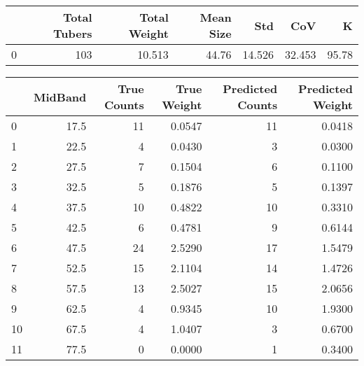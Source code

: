 \begin{tabular}{lrrrrrr}
\toprule
{} &  Total Tubers &  Total Weight &  Mean Size &     Std &     CoV &      K \\
\midrule
0 &           103 &        10.513 &      44.76 &  14.526 &  32.453 &  95.78 \\
\bottomrule
\end{tabular}

\begin{tabular}{lrrrrr}
\toprule
{} &  MidBand &  True Counts &  True Weight &  Predicted Counts &  Predicted Weight \\
\midrule
0  &     17.5 &           11 &       0.0547 &                11 &            0.0418 \\
1  &     22.5 &            4 &       0.0430 &                 3 &            0.0300 \\
2  &     27.5 &            7 &       0.1504 &                 6 &            0.1100 \\
3  &     32.5 &            5 &       0.1876 &                 5 &            0.1397 \\
4  &     37.5 &           10 &       0.4822 &                10 &            0.3310 \\
5  &     42.5 &            6 &       0.4781 &                 9 &            0.6144 \\
6  &     47.5 &           24 &       2.5290 &                17 &            1.5479 \\
7  &     52.5 &           15 &       2.1104 &                14 &            1.4726 \\
8  &     57.5 &           13 &       2.5027 &                15 &            2.0656 \\
9  &     62.5 &            4 &       0.9345 &                10 &            1.9300 \\
10 &     67.5 &            4 &       1.0407 &                 3 &            0.6700 \\
11 &     77.5 &            0 &       0.0000 &                 1 &            0.3400 \\
\bottomrule
\end{tabular}

